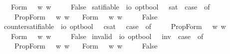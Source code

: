 \begin{isabellebody}
\ \ {\isacharbar}\ Form\ {\isasympsi}\ {\isasymRightarrow}\ {\isasymforall}w{\isachardot}{\isacharparenleft}{\isasympsi}\ w{\isacharparenright}\isanewline
\ \ {\isacharbar}\ {\isacharunderscore}\ {\isasymRightarrow}\ False{\isachardoublequoteclose}\isanewline
{}\isamarkupfalse%
\ satifiable\ {\isacharcolon}{\isacharcolon}\ {\isachardoublequoteopen}io\ opt{\isasymRightarrow}bool{\isachardoublequoteclose}\ \ \ {\isachardoublequoteopen}{\isacharbrackleft}{\isasymphi}{\isacharbrackright}\isactrlsup s\isactrlsup a\isactrlsup t\ {\isasymequiv}\ case\ {\isasymphi}\ of\ \isanewline
\ \ \ \ PropForm\ {\isasympsi}\ {\isasymRightarrow}\ {\isasymexists}w{\isachardot}{\isacharparenleft}{\isasympsi}\ w{\isacharparenright}\isanewline
\ \ {\isacharbar}\ Form\ {\isasympsi}\ {\isasymRightarrow}\ {\isasymexists}w{\isachardot}{\isacharparenleft}{\isasympsi}\ w{\isacharparenright}\isanewline
\ \ {\isacharbar}\ {\isacharunderscore}\ {\isasymRightarrow}\ False{\isachardoublequoteclose}\isanewline
{}\isamarkupfalse%
\ countersatifiable\ {\isacharcolon}{\isacharcolon}\ {\isachardoublequoteopen}io\ opt{\isasymRightarrow}bool{\isachardoublequoteclose}\ \ \ {\isachardoublequoteopen}{\isacharbrackleft}{\isasymphi}{\isacharbrackright}\isactrlsup c\isactrlsup s\isactrlsup a\isactrlsup t\ {\isasymequiv}\ \ case\ {\isasymphi}\ of\ \isanewline
\ \ \ \ PropForm\ {\isasympsi}\ {\isasymRightarrow}\ {\isasymexists}w{\isachardot}{\isasymnot}{\isacharparenleft}{\isasympsi}\ w{\isacharparenright}\isanewline
\ \ {\isacharbar}\ Form\ {\isasympsi}\ {\isasymRightarrow}\ {\isasymexists}w{\isachardot}{\isasymnot}{\isacharparenleft}{\isasympsi}\ w{\isacharparenright}\isanewline
\ \ {\isacharbar}\ {\isacharunderscore}\ {\isasymRightarrow}\ False{\isachardoublequoteclose}\isanewline
{}\isamarkupfalse%
\ invalid\ {\isacharcolon}{\isacharcolon}\ {\isachardoublequoteopen}io\ opt{\isasymRightarrow}bool{\isachardoublequoteclose}\ \ \ {\isachardoublequoteopen}{\isacharbrackleft}{\isasymphi}{\isacharbrackright}\isactrlsup i\isactrlsup n\isactrlsup v\ {\isasymequiv}\ case\ {\isasymphi}\ of\ \isanewline
\ \ \ \ PropForm\ {\isasympsi}\ {\isasymRightarrow}\ {\isasymforall}w{\isachardot}{\isasymnot}{\isacharparenleft}{\isasympsi}\ w{\isacharparenright}\isanewline
\ \ {\isacharbar}\ Form\ {\isasympsi}\ {\isasymRightarrow}\ {\isasymforall}w{\isachardot}{\isasymnot}{\isacharparenleft}{\isasympsi}\ w{\isacharparenright}\isanewline
\ \ {\isacharbar}\ {\isacharunderscore}\ {\isasymRightarrow}\ False{\isachardoublequoteclose}%

\end{isabellebody}
